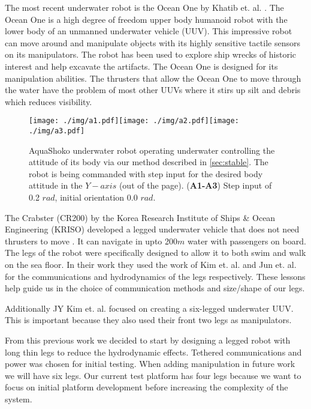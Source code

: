 The most recent underwater robot is the Ocean One by Khatib et. al. \cite{oceanone}.
The Ocean One is a high degree of freedom upper body humanoid robot with the lower body of an unmanned underwater vehicle (UUV).
This impressive robot can move around and manipulate objects with its highly sensitive tactile sensors on its manipulators.
The robot has been used to explore ship wrecks of historic interest and help excavate the artifacts.
The Ocean One is designed for its manipulation abilities.
The thrusters that allow the Ocean One to move through the water have the problem of most other UUVs where it stirs up silt and debris which reduces visibility.

\begin{figure*}[th]
\centering
\texttt{[image: ./img/a1.pdf]}\texttt{[image: ./img/a2.pdf]}\texttt{[image: ./img/a3.pdf]}
\caption{AquaShoko underwater robot operating underwater controlling the attitude of its body via our method described in \ref{sec:stable}. The robot is being commanded with step input for the desired body attitude in the $Y-axis$ (out of the page).  (\textbf{A1-A3}) Step input of 0.2 $rad$, initial orientation 0.0 $rad$.  }
\label{fig:underwarter}
\end{figure*}


The Crabster (CR200) by the Korea Research Institute of Ships \& Ocean Engineering (KRISO) developed a legged underwater vehicle that does not need thrusters to move \cite{seacrab}.
It can navigate in upto 200$m$ water with passengers on board.
The legs of the robot were specifically designed to allow it to both swim and walk on the sea floor.
In their work they used the work of Kim et. al. \cite{crab1} and Jun et. al. for the communications and hydrodynamics of the legs respectively. 
These lessons help guide us in the choice of communication methods and size/shape of our legs.

Additionally JY Kim et. al. \cite{crab3} focused on creating a six-legged underwater UUV.
This is important because they also used their front two legs as manipulators.


From this previous work we decided to start by designing a legged robot with long thin legs to reduce the hydrodynamic effects.
Tethered communications and power was chosen for initial testing.
When adding manipulation in future work we will have six legs.  
Our current test platform has four legs because we want to focus on initial platform development before increasing the complexity of the system.

